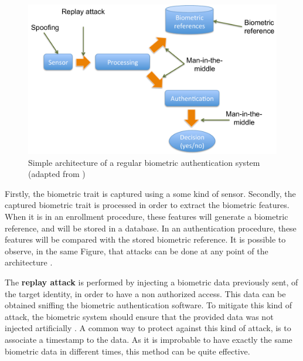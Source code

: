 \begin{figure}[!htb]
\begin{center}
\includegraphics [width=14cm] {images/diagram_attacks.pdf}
\caption[Simple architecture of a regular biometric authentication system]{Simple architecture of a regular biometric authentication system (adapted from \cite{xiao2005security})} \label{fig:diagram_attacks}
\end{center}
\end{figure}

Firstly, the biometric trait is captured using a some kind of sensor. Secondly, the captured biometric trait is processed in order to extract the biometric features. When it is in an enrollment procedure, these features will generate a biometric reference, and will be stored in a database. In an authentication procedure, these features will be compared with the stored biometric reference. It is possible to observe, in the same Figure, that attacks can be done at any point of the architecture \cite{xiao2005security}. 


The \textbf{replay attack} is performed by injecting a biometric data previously sent, of the target identity, in order to have a non authorized access. This data can be obtained sniffing the biometric authentication software. To mitigate this kind of attack, the biometric system should ensure that the provided data was not injected artificially \cite{xiao2005security}. A common way to protect against this kind of attack, is to associate a timestamp to the data. As it is improbable to have exactly the same biometric data in different times, this method can be quite effective.

